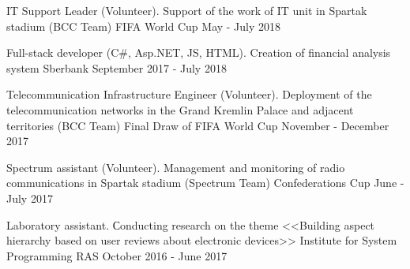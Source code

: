 

\vspace{0cm}\begin{cventries}
	
\cventry
{IT Support Leader (Volunteer). Support of the work of IT unit in Spartak stadium (BCC Team)} %
{FIFA World Cup} %
{} %
{May - July 2018} %
\noindent	

\cventry
{Full-stack developer (C\#, Asp.NET, JS, HTML). Creation of financial analysis system} %
{Sberbank} %
{} %
{September 2017 - July 2018} %
\noindent	

\cventry
{Telecommunication Infrastructure Engineer (Volunteer). Deployment of the telecommunication networks in the Grand Kremlin Palace and adjacent territories (BCC Team)} %
{Final Draw of FIFA World Cup} %
{} %
{November - December 2017} %
\noindent	
	
\cventry
{Spectrum assistant (Volunteer). Management and monitoring of radio communications in Spartak stadium (Spectrum Team)} %
{Confederations Cup} %
{} %
{June - July 2017} %
\noindent	




\cventry
{Laboratory assistant. Сonducting research on the theme <<Building aspect hierarchy based on user reviews about electronic devices>>} %
{Institute for System Programming RAS} %
{} %
{October 2016 - June 2017} %
\noindent	



\end{cventries}
